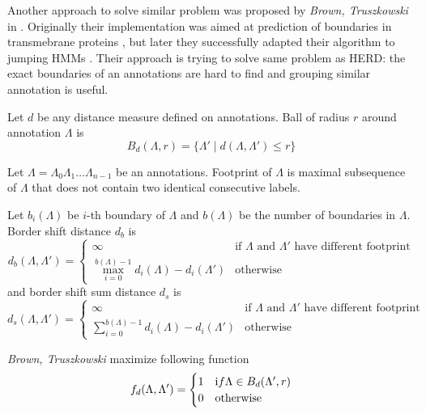 Another approach to solve similar problem was proposed by {\it Brown,
Truszkowski} in \cite{Brown2010}. Originally their implementation was aimed at
prediction of boundaries in transmebrane proteins \cite{Brown2010}, but later
they successfully adapted their algorithm to jumping HMMs \cite{Truszkowski2011}.
Their approach is trying to solve same problem as HERD: the exact boundaries of
an annotations are hard to find and grouping similar annotation is useful.

\begin{definition}
Let $d$ be any distance measure defined on annotations. Ball of radius $r$
around annotation $\Lambda$ is 
\begin{equation*}
B_d(\Lambda,r) = \{\Lambda'\mid d(\Lambda,\Lambda')\leq r\}
\end{equation*}
\end{definition}

\begin{definition}
Let $\Lambda=\Lambda_0\Lambda_1\dots\Lambda_{n-1}$ be an annotations. Footprint
of $\Lambda$ is maximal subsequence of $\Lambda$ that does not contain two
identical 
consecutive labels.
\end{definition}

\begin{definition}
Let $b_i(\Lambda)$ be $i$-th boundary of $\Lambda$ and $b(\Lambda)$ be the
number of boundaries in $\Lambda$.
Border shift distance $d_{b}$ is 
\begin{equation*}
d_{b}(\Lambda,\Lambda') = \begin{cases}
\infty & \text{if $\Lambda$ and $\Lambda'$ have different footprint}\\
\max_{i=0}^{b(\Lambda)-1} d_i(\Lambda)-d_i(\Lambda') & \text{otherwise}
\end{cases}
\end{equation*}
and border shift sum distance $d_s$ is 
\begin{equation*}
d_{s}(\Lambda,\Lambda') = \begin{cases}
\infty & \text{if $\Lambda$ and $\Lambda'$ have different footprint}\\
\sum_{i=0}^{b(\Lambda)-1} d_i(\Lambda)-d_i(\Lambda') & \text{otherwise}
\end{cases}
\end{equation*}

\end{definition}

{\it Brown,
Truszkowski} maximize following function
\begin{equation*}
f_d(\Lambda,\Lambda') = 
\begin{cases}
1 & {\text if }\Lambda\in B_d(\Lambda',r)\\
0 & \text{otherwise}
\end{cases}
\end{equation*}

